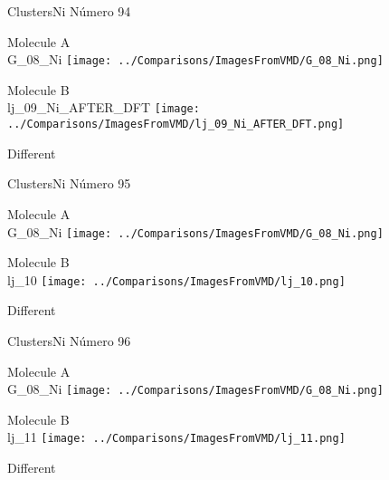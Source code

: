  \newpage

\vtab[-3cm]
\begin{center}
{\large ClustersNi \tab Número 94}
\end{center}
\begin{multicols}{2}
\begin{center}
Molecule A \\ 
G\_08\_Ni
\texttt{[image: ../Comparisons/ImagesFromVMD/G\_08\_Ni.png]}
\\
\vtab

\columnbreak
Molecule B \\ 
lj\_09\_Ni\_AFTER\_DFT
\texttt{[image: ../Comparisons/ImagesFromVMD/lj\_09\_Ni\_AFTER\_DFT.png]}
\\
\vtab


\end{center}
\end{multicols}
\begin{center}
\textcolor{NavyBlue}{\Large Different}
\end{center}

 \newpage

\vtab[-3cm]
\begin{center}
{\large ClustersNi \tab Número 95}
\end{center}
\begin{multicols}{2}
\begin{center}
Molecule A \\ 
G\_08\_Ni
\texttt{[image: ../Comparisons/ImagesFromVMD/G\_08\_Ni.png]}
\\
\vtab

\columnbreak
Molecule B \\ 
lj\_10
\texttt{[image: ../Comparisons/ImagesFromVMD/lj\_10.png]}
\\
\vtab


\end{center}
\end{multicols}
\begin{center}
\textcolor{NavyBlue}{\Large Different}
\end{center}

 \newpage

\vtab[-3cm]
\begin{center}
{\large ClustersNi \tab Número 96}
\end{center}
\begin{multicols}{2}
\begin{center}
Molecule A \\ 
G\_08\_Ni
\texttt{[image: ../Comparisons/ImagesFromVMD/G\_08\_Ni.png]}
\\
\vtab

\columnbreak
Molecule B \\ 
lj\_11
\texttt{[image: ../Comparisons/ImagesFromVMD/lj\_11.png]}
\\
\vtab


\end{center}
\end{multicols}
\begin{center}
\textcolor{NavyBlue}{\Large Different}
\end{center}

